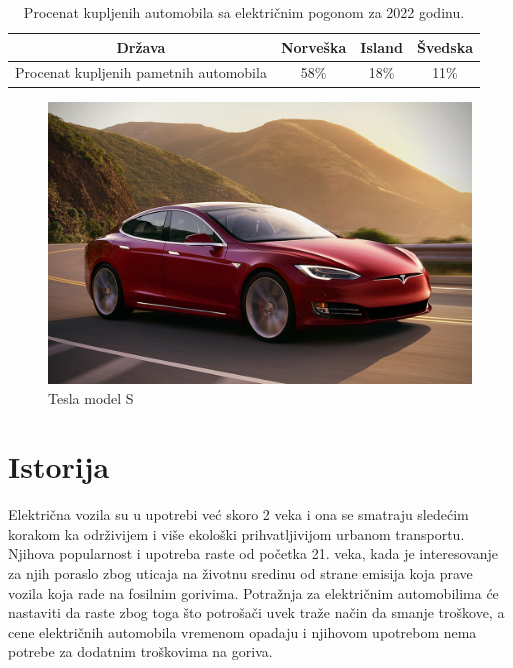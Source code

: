 \documentclass[a4paper]{article}
\begin{document}
\begin{table}[h!]
\begin{center}
\caption{Procenat kupljenih automobila sa električnim pogonom za 2022 godinu.}
\begin{tabular}{|c|c|c|c|} \hline
Država& Norveška& Island& Švedska\\ \hline
Procenat kupljenih pametnih automobila& 58\%& 18\%& 11\%\\ \hline
\end{tabular}
\label{tab:tabela1}
\end{center}
\end{table}



\begin{figure}[h]
        \centering
        \includegraphics[width=\linewidth]{tesla.jpeg}
        \caption{Tesla model S}
        \label{fig:IMG_Tesla}
        \end{figure}
\cite{uvod1}  
         
\label{sec:uvod}












\section{Istorija}
\label{sec:naslov1}


Električna vozila su u upotrebi već skoro 2 veka i ona se smatraju sledećim korakom ka održivijem i više ekološki prihvatljivijom urbanom transportu. Njihova popularnost i upotreba raste od početka 21. veka, kada je interesovanje za njih poraslo zbog uticaja na životnu sredinu od strane emisija koja prave vozila koja rade na fosilnim gorivima. Potražnja za električnim automobilima će nastaviti da raste zbog toga što potrošači uvek traže način da smanje troškove, a cene električnih automobila vremenom opadaju i njihovom upotrebom nema potrebe za dodatnim troškovima na goriva.
\cite{istorija1}
\end{document}
